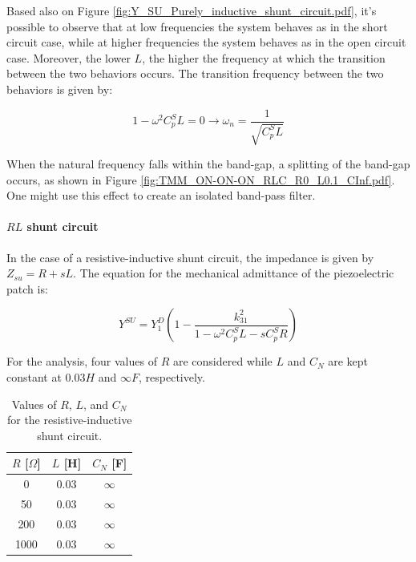 Based also on Figure \ref{fig:Y_SU_Purely_inductive_shunt_circuit.pdf}, it's possible to observe that at low frequencies the system behaves as in the short circuit case, while at higher frequencies the system behaves as in the open circuit case.
Moreover, the lower $L$, the higher the frequency at which the transition between the two behaviors occurs.
The transition frequency between the two behaviors is given by:

\begin{equation}
    1 - \omega^2 C_p^S L = 0 \rightarrow \omega_n = \frac{1}{\sqrt{C_p^S L}}
\end{equation}

When the natural frequency falls within the band-gap, a splitting of the band-gap occurs, as shown in Figure \ref{fig:TMM_ON-ON-ON_RLC_R0_L0.1_CInf.pdf}.
One might use this effect to create an isolated band-pass filter.


\paragraph{$RL$ shunt circuit}

In the case of a resistive-inductive shunt circuit, the impedance is given by $Z_{su} = R + sL$.
The equation for the mechanical admittance of the piezoelectric patch is:

\begin{equation}
    Y^{SU} = Y_1^D \left( 1 - \frac{k_{31}^2}{1 -\omega^2 C_p^S L - s C_p^S R} \right)
    \label{eq:mechanical_admittance_RL_shunt}
\end{equation}

For the analysis, four values of $R$ are considered while $L$ and $C_N$ are kept constant at $0.03 H$ and $\infty F$, respectively.

\begin{table}[H]
    \centering
    \begin{tabular}{|c|c|c|}
        \hline
        $R$ [$\Omega$] & $L$ [H] & $C_N$ [F] \\
        \hline
        0              & 0.03    & $\infty$  \\
        50             & 0.03    & $\infty$  \\
        200            & 0.03    & $\infty$  \\
        1000           & 0.03    & $\infty$  \\
        \hline
    \end{tabular}
    \caption{Values of $R$, $L$, and $C_N$ for the resistive-inductive shunt circuit.}
    \label{tab:RLC_N_values_RL_case}
\end{table}

